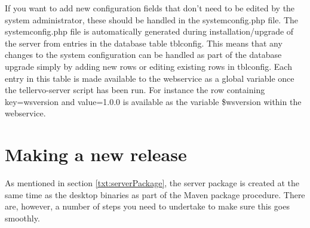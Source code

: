 If you want to add new configuration fields that don't need to be edited by the system administrator, these should be handled in the systemconfig.php file.  The systemconfig.php file is automatically generated during installation/upgrade of the server from entries in the database table tblconfig.  This means that any changes to the system configuration can be handled as part of the database upgrade simply by adding new rows or editing existing rows in tblconfig.  Each entry in this table is made available to the webservice as a global variable once the tellervo-server script has been run.  For instance the row containing key=wsversion and value=1.0.0 is available as the variable \$wsversion within the webservice. 



\section{Making a new release}

As mentioned in section \ref{txt:serverPackage}, the server package is created at the same time as the desktop binaries as part of the Maven package procedure.  There are, however, a number of steps you need to undertake to make sure this goes smoothly.

